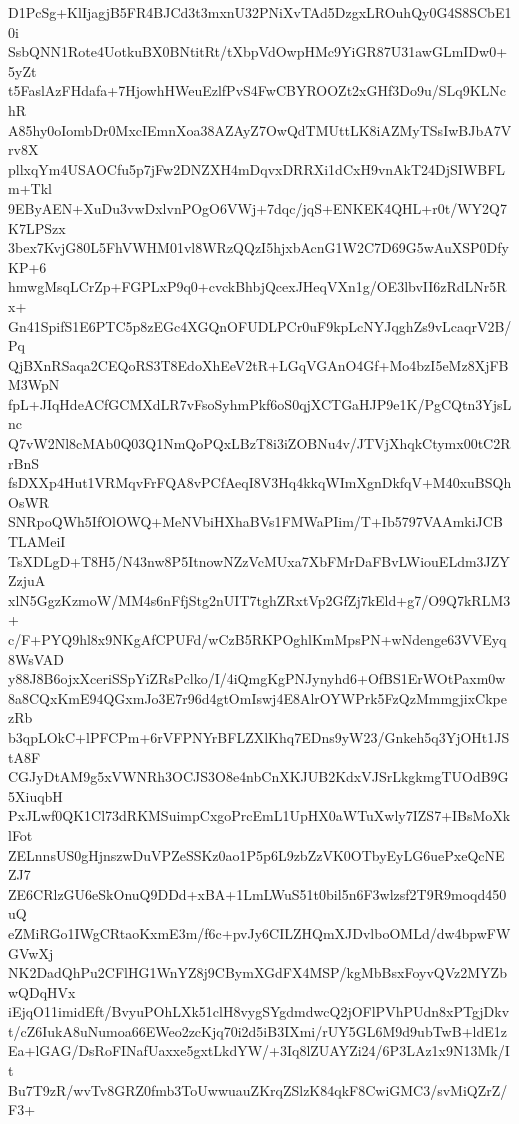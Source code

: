 D1PcSg+KlIjagjB5FR4BJCd3t3mxnU32PNiXvTAd5DzgxLROuhQy0G4S8SCbE10i
SsbQNN1Rote4UotkuBX0BNtitRt/tXbpVdOwpHMc9YiGR87U31awGLmIDw0+5yZt
t5FaslAzFHdafa+7HjowhHWeuEzlfPvS4FwCBYROOZt2xGHf3Do9u/SLq9KLNchR
A85hy0oIombDr0MxcIEmnXoa38AZAyZ7OwQdTMUttLK8iAZMyTSsIwBJbA7Vrv8X
pllxqYm4USAOCfu5p7jFw2DNZXH4mDqvxDRRXi1dCxH9vnAkT24DjSIWBFLm+Tkl
9EByAEN+XuDu3vwDxlvnPOgO6VWj+7dqc/jqS+ENKEK4QHL+r0t/WY2Q7K7LPSzx
3bex7KvjG80L5FhVWHM01vl8WRzQQzI5hjxbAcnG1W2C7D69G5wAuXSP0DfyKP+6
hmwgMsqLCrZp+FGPLxP9q0+cvckBhbjQcexJHeqVXn1g/OE3lbvII6zRdLNr5Rx+
Gn41SpifS1E6PTC5p8zEGc4XGQnOFUDLPCr0uF9kpLcNYJqghZs9vLcaqrV2B/Pq
QjBXnRSaqa2CEQoRS3T8EdoXhEeV2tR+LGqVGAnO4Gf+Mo4bzI5eMz8XjFBM3WpN
fpL+JIqHdeACfGCMXdLR7vFsoSyhmPkf6oS0qjXCTGaHJP9e1K/PgCQtn3YjsLnc
Q7vW2Nl8cMAb0Q03Q1NmQoPQxLBzT8i3iZOBNu4v/JTVjXhqkCtymx00tC2RrBnS
fsDXXp4Hut1VRMqvFrFQA8vPCfAeqI8V3Hq4kkqWImXgnDkfqV+M40xuBSQhOsWR
SNRpoQWh5IfOlOWQ+MeNVbiHXhaBVs1FMWaPIim/T+Ib5797VAAmkiJCBTLAMeiI
TsXDLgD+T8H5/N43nw8P5ItnowNZzVcMUxa7XbFMrDaFBvLWiouELdm3JZYZzjuA
xlN5GgzKzmoW/MM4s6nFfjStg2nUIT7tghZRxtVp2GfZj7kEld+g7/O9Q7kRLM3+
c/F+PYQ9hl8x9NKgAfCPUFd/wCzB5RKPOghlKmMpsPN+wNdenge63VVEyq8WsVAD
y88J8B6ojxXceriSSpYiZRsPclko/I/4iQmgKgPNJynyhd6+OfBS1ErWOtPaxm0w
8a8CQxKmE94QGxmJo3E7r96d4gtOmIswj4E8AlrOYWPrk5FzQzMmmgjixCkpezRb
b3qpLOkC+lPFCPm+6rVFPNYrBFLZXlKhq7EDns9yW23/Gnkeh5q3YjOHt1JStA8F
CGJyDtAM9g5xVWNRh3OCJS3O8e4nbCnXKJUB2KdxVJSrLkgkmgTUOdB9G5XiuqbH
PxJLwf0QK1Cl73dRKMSuimpCxgoPrcEmL1UpHX0aWTuXwly7IZS7+IBsMoXklFot
ZELnnsUS0gHjnszwDuVPZeSSKz0ao1P5p6L9zbZzVK0OTbyEyLG6uePxeQcNEZJ7
ZE6CRlzGU6eSkOnuQ9DDd+xBA+1LmLWuS51t0bil5n6F3wlzsf2T9R9moqd450uQ
eZMiRGo1IWgCRtaoKxmE3m/f6c+pvJy6CILZHQmXJDvlboOMLd/dw4bpwFWGVwXj
NK2DadQhPu2CFlHG1WnYZ8j9CBymXGdFX4MSP/kgMbBsxFoyvQVz2MYZbwQDqHVx
iEjqO11imidEft/BvyuPOhLXk51clH8vygSYgdmdwcQ2jOFlPVhPUdn8xPTgjDkv
t/cZ6IukA8uNumoa66EWeo2zcKjq70i2d5iB3IXmi/rUY5GL6M9d9ubTwB+ldE1z
Ea+lGAG/DsRoFINafUaxxe5gxtLkdYW/+3Iq8lZUAYZi24/6P3LAz1x9N13Mk/It
Bu7T9zR/wvTv8GRZ0fmb3ToUwwuauZKrqZSlzK84qkF8CwiGMC3/svMiQZrZ/F3+
